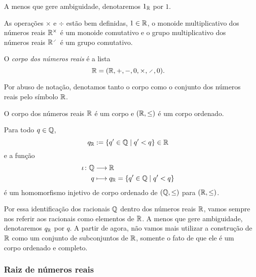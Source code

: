 A menos que gere ambiguidade, denotaremos $1_{\mathbb{R}}$ por $1$.

\begin{exercise}
As operações $\times$ e $\div$ estão bem definidas, $1 \in \mathbb{R}$, o monoide multiplicativo dos números reais $\mathbb{R}^\times$ é um monoide comutativo e o grupo multiplicativo dos números reais $\R^{\div}$ é um grupo comutativo.
\end{exercise}

\begin{definition}
O \emph{corpo dos números reais} é a lista
	\begin{equation*}
	\R = (\R,+,-,0,\times,\div,0).
	\end{equation*}
\end{definition}

Por abuso de notação, denotamos tanto o corpo como o conjunto dos números reais pelo símbolo $\mathbb{R}$.

\begin{exercise}
O corpo dos números reais $\mathbb{R}$ é um corpo e $(\mathbb{R},\leq)$ é um corpo ordenado.
\end{exercise}

\begin{exercise}
Para todo $q \in \mathbb{Q}$,
	\begin{equation*}
	q_{\mathbb{R}} := \left\{{q' \in \mathbb{Q}}\;\middle\vert\;{q' < q}\right\} \in \mathbb{R}
	\end{equation*}
e a função
	\begin{align*}
	{\iota}\colon {\mathbb{Q}} &\longrightarrow {\mathbb{R}} \\{q} &\longmapsto q_{\mathbb{R}} = \left\{{q' \in \mathbb{Q}}\;\middle\vert\;{q' < q}\right\}
	\end{align*}
é um homomorfismo injetivo de corpo ordenado de $(\mathbb{Q},\leq)$ para $(\mathbb{R},\leq)$.
\end{exercise}

Por essa identificação dos racionais $\mathbb{Q}$ dentro dos números reais $\mathbb{R}$, vamos sempre nos referir aos racionais como elementos de $\mathbb{R}$. A menos que gere ambiguidade, denotaremos $q_{\mathbb{R}}$ por $q$. A partir de agora, não vamos mais utilizar a construção de $\mathbb{R}$ como um conjunto de subconjuntos de $\mathbb{R}$, somente o fato de que ele é um corpo ordenado e completo.

\subsubsection{Raiz de números reais}

